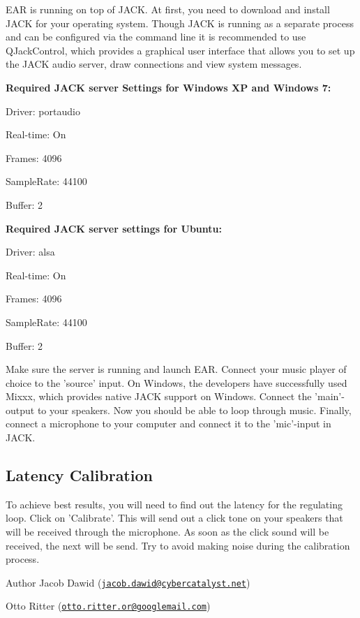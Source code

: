 \-E\-A\-R is running on top of \-J\-A\-C\-K. \-At first, you need to download and install \-J\-A\-C\-K for your operating system. \-Though \-J\-A\-C\-K is running as a separate process and can be configured via the command line it is recommended to use \-Q\-Jack\-Control, which provides a graphical user interface that allows you to set up the \-J\-A\-C\-K audio server, draw connections and view system messages. \par
\par
 {\bfseries \-Required \-J\-A\-C\-K server \-Settings for \-Windows \-X\-P and \-Windows 7\-:}
\begin{DoxyItemize}
\item \-Driver\-: portaudio
\item \-Real-\/time\-: \-On
\item \-Frames\-: 4096
\item \-Sample\-Rate\-: 44100
\item \-Buffer\-: 2
\end{DoxyItemize}

\par
 {\bfseries \-Required \-J\-A\-C\-K server settings for \-Ubuntu\-:}
\begin{DoxyItemize}
\item \-Driver\-: alsa
\item \-Real-\/time\-: \-On
\item \-Frames\-: 4096
\item \-Sample\-Rate\-: 44100
\item \-Buffer\-: 2
\end{DoxyItemize}

\-Make sure the server is running and launch \-E\-A\-R. \-Connect your music player of choice to the 'source' input. \-On \-Windows, the developers have successfully used \-Mixxx, which provides native \-J\-A\-C\-K support on \-Windows. \-Connect the 'main'-\/output to your speakers. \-Now you should be able to loop through music. \-Finally, connect a microphone to your computer and connect it to the 'mic'-\/input in \-J\-A\-C\-K. \par
 \subsection*{\-Latency \-Calibration}

\-To achieve best results, you will need to find out the latency for the regulating loop. \-Click on '\-Calibrate'. \-This will send out a click tone on your speakers that will be received through the microphone. \-As soon as the click sound will be received, the next will be send. \-Try to avoid making noise during the calibration process. \begin{DoxyAuthor}{\-Author}
\-Jacob \-Dawid (\href{mailto:jacob.dawid@cybercatalyst.net}{\tt jacob.\-dawid@cybercatalyst.\-net}) 

\-Otto \-Ritter (\href{mailto:otto.ritter.or@googlemail.com}{\tt otto.\-ritter.\-or@googlemail.\-com}) 
\end{DoxyAuthor}
